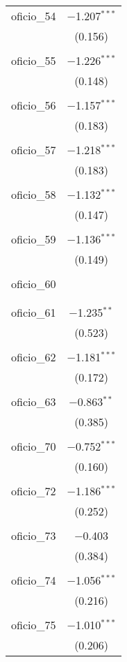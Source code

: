 \begin{table}[!htbp]
\begin{tabular}{@{\extracolsep{5pt}}lc}
 oficio\_54 & $-$1.207$^{***}$ \\ 
  & (0.156) \\ 
  & \\ 
 oficio\_55 & $-$1.226$^{***}$ \\ 
  & (0.148) \\ 
  & \\ 
 oficio\_56 & $-$1.157$^{***}$ \\ 
  & (0.183) \\ 
  & \\ 
 oficio\_57 & $-$1.218$^{***}$ \\ 
  & (0.183) \\ 
  & \\ 
 oficio\_58 & $-$1.132$^{***}$ \\ 
  & (0.147) \\ 
  & \\ 
 oficio\_59 & $-$1.136$^{***}$ \\ 
  & (0.149) \\ 
  & \\ 
 oficio\_60 &  \\ 
  &  \\ 
  & \\ 
 oficio\_61 & $-$1.235$^{**}$ \\ 
  & (0.523) \\ 
  & \\ 
 oficio\_62 & $-$1.181$^{***}$ \\ 
  & (0.172) \\ 
  & \\ 
 oficio\_63 & $-$0.863$^{**}$ \\ 
  & (0.385) \\ 
  & \\ 
 oficio\_70 & $-$0.752$^{***}$ \\ 
  & (0.160) \\ 
  & \\ 
 oficio\_72 & $-$1.186$^{***}$ \\ 
  & (0.252) \\ 
  & \\ 
 oficio\_73 & $-$0.403 \\ 
  & (0.384) \\ 
  & \\ 
 oficio\_74 & $-$1.056$^{***}$ \\ 
  & (0.216) \\ 
  & \\ 
 oficio\_75 & $-$1.010$^{***}$ \\ 
  & (0.206) \\ 

\end{tabular}
\end{table}
